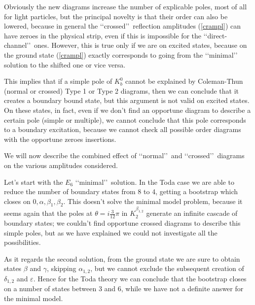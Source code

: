 \documentclass[a4paper,12pt]{report}
\begin{document}
\vspace{0.5cm}

Obviously the new diagrams increase the number of explicable poles, most of all for light particles, but the
principal novelty is that their order can also be lowered, because in general the \lq\lq crossed\rq\rq \,
reflection amplitudes (\ref{crampl}) can have zeroes in the physical strip, even if this is impossible for the
\lq\lq direct-channel\rq\rq \, ones. However, this is true only if we are on excited states, because on the ground
state (\ref{crampl}) exactly corresponds to going from the \lq\lq minimal\rq\rq \, solution to the shifted one or
vice versa.

This implies that if a simple pole of $K_{b}^{0}$ cannot be explained by Coleman-Thun (normal or crossed) Type 1
or Type 2 diagrams, then we can conclude that it creates a boundary bound state, but this argument is not valid
on excited states. On these states, in fact, even if we don't find an opportune diagram to describe a certain pole
(simple or multiple), we cannot conclude that this pole corresponds to a boundary excitation, because we cannot
check all possible order diagrams with the opportune zeroes insertions.

\vspace{0.5cm}

We will now describe the combined effect of \lq\lq normal\rq\rq \, and \lq\lq crossed\rq\rq \, diagrams on the
various amplitudes considered.

\vspace{0.5cm}

Let's start with the $E_{6}$ \lq\lq minimal\rq\rq \, solution. In the Toda case we are able to reduce the number
of boundary states from 8 to 4, getting a bootstrap which closes on $0,\alpha,\beta_{1},\beta_{2}$. This doesn't
solve the minimal model problem, because it seems again that the poles at $\theta=i\frac{3}{12}\pi$ in
$K_{2}^{\beta_{1,2}}$ generate an infinite cascade of boundary states; we couldn't find opportune crossed
diagrams to describe this simple poles, but as we have explained we could not investigate all the possibilities.

As it regards the second solution, from the ground state we are sure to obtain states $\beta$ and $\gamma$,
skipping $\alpha_{1,2}$, but we cannot exclude the subsequent creation of $\delta_{1,2}$ and $\varepsilon$. Hence
for the Toda theory we can conclude that the bootstrap closes on a number of states between 3 and 6, while we
have not a definite answer for the minimal model.
\end{document}
